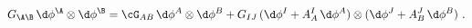 \begin{equation}
  G_{\A\B}\, \d\phi^\A \otimes \d\phi^\B = \cG_{AB}\, \d\phi^A \otimes
  \d\phi^B + G_{IJ}\, (\d\phi^I + A_A^I\, \d\phi^A) \otimes (\d\phi^J
  + A_B^J\, \d\phi^B)\ .
 \end{equation}

